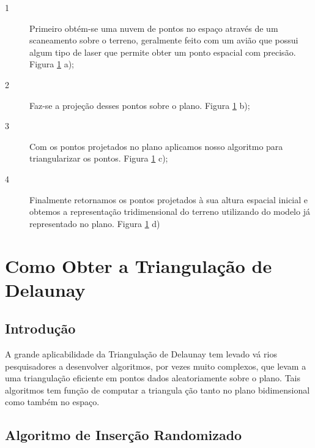 \documentclass[12pt,a4paper]{book}
\begin{document}
\begin{description}
\item[1] Primeiro obt\'em-se uma nuvem de pontos no espa\c{c}o atrav\'es de um scaneamento sobre o terreno, geralmente feito com um avi\~ao que possui algum tipo de laser que permite obter um ponto espacial com precis\~ao. Figura \ref{figura_plano1} a);

\item[2] Faz-se a proje\c{c}\~{a}o desses pontos sobre o plano. Figura \ref{figura_plano1} b);

\item[3] Com os pontos projetados no plano aplicamos nosso algoritmo para triangularizar os pontos. Figura \ref{figura_plano1} c);

\item[4] Finalmente retornamos os pontos projetados \`a sua altura espacial inicial e obtemos a representa\c{c}\~{a}o tridimensional do terreno utilizando do modelo j\'a representado no plano. Figura \ref{figura_plano1} d)
\end{description}


\begin{figure}[htbp]
  \begin{center}
    \leavevmode
    
    \caption{}
    \label{figura_plano1}
  \end{center}
\end{figure}

\chapter[Algoritmos]{Como Obter a Triangula\c{c}\~ao de Delaunay} \label{chapter4}

\section{Introdu\c{c}\~{a}o}

A grande aplicabilidade da Triangula\c{c}\~{a}o de Delaunay tem levado v\'{a}%
rios pesquisadores a desenvolver algoritmos, por vezes muito complexos, que
levam a uma triangula\c{c}\~{a}o eficiente em pontos dados aleatoriamente
sobre o plano. Tais algoritmos tem fun\c{c}\~{a}o de computar a triangula%
\c{c}\~{a}o tanto no plano bidimensional como tamb\'{e}m no espa\c{c}o. 


\section{Algoritmo de Inser\c{c}\~ao Randomizado}
\end{document}
